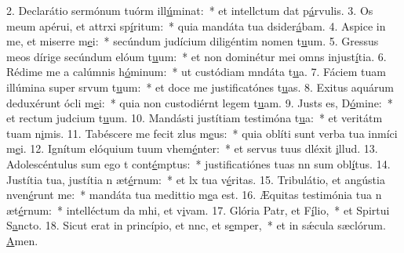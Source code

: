 2. Declarátio sermónum tuórm ill\uline{ú}minat:~* et intellctum dat p\uline{á}rvulis.
3. Os meum apérui, et attrxi sp\uline{í}ritum:~* quia mandáta tua dsider\uline{á}bam.
4. Aspice in me, et miserre m\uline{e}i:~* secúndum judícium diligéntim nomen t\uline{u}um.
5. Gressus meos dírige secúndum elóum t\uline{u}um:~* et non dominétur mei omns injust\uline{í}tia.
6. Rédime me a calúmnis h\uline{ó}minum:~* ut custódiam mndáta t\uline{u}a.
7. Fáciem tuam illúmina super srvum t\uline{u}um:~* et doce me justificatónes t\uline{u}as.
8. Exitus aquárum deduxérunt ócli m\uline{e}i:~* quia non custodiérnt legem t\uline{u}am.
9. Justs es, D\uline{ó}mine:~* et rectum judcium t\uline{u}um.
10. Mandásti justítiam testimóna t\uline{u}a:~* et veritátm tuam n\uline{i}mis.
11. Tabéscere me fecit zlus m\uline{e}us:~* quia oblíti sunt verba tua inmíci m\uline{e}i.
12. Ignítum elóquium tuum vhem\uline{é}nter:~* et servus tuus dléxit \uline{i}llud.
13. Adolescéntulus sum ego t cont\uline{é}mptus:~* justificatiónes tuas nn sum obl\uline{í}tus.
14. Justítia tua, justítia n æt\uline{é}rnum:~* et lx tua v\uline{é}ritas.
15. Tribulátio, et angústia nven\uline{é}runt me:~* mandáta tua medittio m\uline{e}a est.
16. Æquitas testimónia tua n æt\uline{é}rnum:~* intelléctum da mhi, et v\uline{i}vam.
17. Glória Patr, et F\uline{í}lio,~* et Spirtui S\uline{a}ncto.
18. Sicut erat in princípio, et nnc, et s\uline{e}mper,~* et in sǽcula sæclórum. \uline{A}men.
